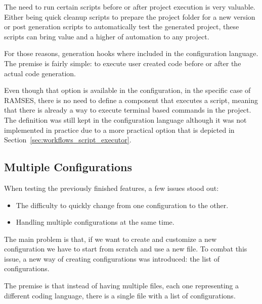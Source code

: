 The need to run certain scripts before or after project execution is very valuable. Either being quick cleanup scripts to prepare the project folder for a new version or post generation scripts to automatically test the generated project, these scripts can bring value and a higher of automation to any project.

For those reasons, generation hooks where included in the configuration language. The premise is fairly simple: to execute user created code before or after the actual code generation.

Even though that option is available in the configuration, in the specific case of \gls{RAMSES}, there is no need to define a component that executes a script, meaning that there is already a way to execute terminal based commands in the project. The definition was still kept in the configuration language although it was not implemented in practice due to a more practical option that is depicted in Section~\ref{sec:workflows_script_executor}.


\subsection{Multiple Configurations}
\label{sec:impl_multi_config}

When testing the previously finished features, a few issues stood out: 

\begin{itemize} 
	\item The difficulty to quickly change from one configuration to the other.
	\item Handling multiple configurations at the same time.
\end{itemize}

The main problem is that, if we want to create and customize a new configuration we have to start from scratch and use a new file. To combat this issue, a new way of creating configurations was introduced: the list of configurations.

The premise is that instead of having multiple files, each one representing a different coding language, there is a single file with a list of configurations.

